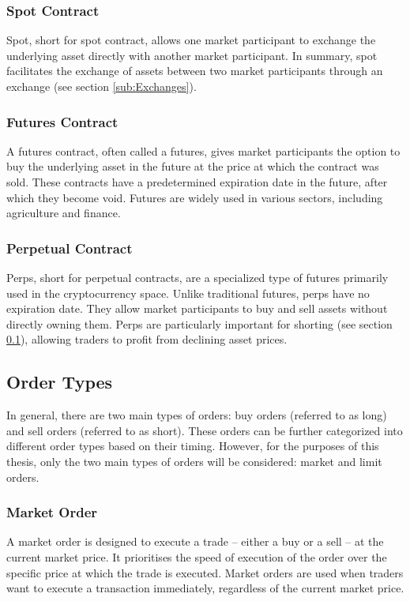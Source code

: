 \subsubsection{Spot Contract}
\label{subsub:Spot}
Spot, short for spot contract, allows one market participant to exchange the underlying asset directly with another market participant. In summary, spot facilitates the exchange of assets between two market participants through an exchange (see section \ref{sub:Exchanges}).

\subsubsection{Futures Contract}
\label{subsub:Futures}
A futures contract, often called a futures, gives market participants the option to buy the underlying asset in the future at the price at which the contract was sold. These contracts have a predetermined expiration date in the future, after which they become void. Futures are widely used in various sectors, including agriculture and finance.

\subsubsection{Perpetual Contract}
\label{subsub:Perps}
Perps, short for perpetual contracts, are a specialized type of futures primarily used in the cryptocurrency space. Unlike traditional futures, perps have no expiration date. They allow market participants to buy and sell assets without directly owning them. Perps are particularly important for shorting (see section \ref{sub:OrderTypes}), allowing traders to profit from declining asset prices.

\subsection{Order Types}
\label{sub:OrderTypes}
In general, there are two main types of orders: buy orders (referred to as long) and sell orders (referred to as short). These orders can be further categorized into different order types based on their timing. However, for the purposes of this thesis, only the two main types of orders will be considered: market and limit orders.

\subsubsection{Market Order}
\label{subsub:MarketOrder}
A market order is designed to execute a trade – either a buy or a sell – at the current market price. It prioritises the speed of execution of the order over the specific price at which the trade is executed. Market orders are used when traders want to execute a transaction immediately, regardless of the current market price.

